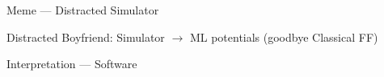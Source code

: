 \begin{frame}{Meme --- Distracted Simulator}
	\begin{center}
		{\footnotesize\color{softgray} Distracted Boyfriend: Simulator \ensuremath{\rightarrow} ML potentials (goodbye Classical FF)}
	\end{center}
\end{frame}

\begin{frame}{Interpretation --- Software}
\end{frame}
